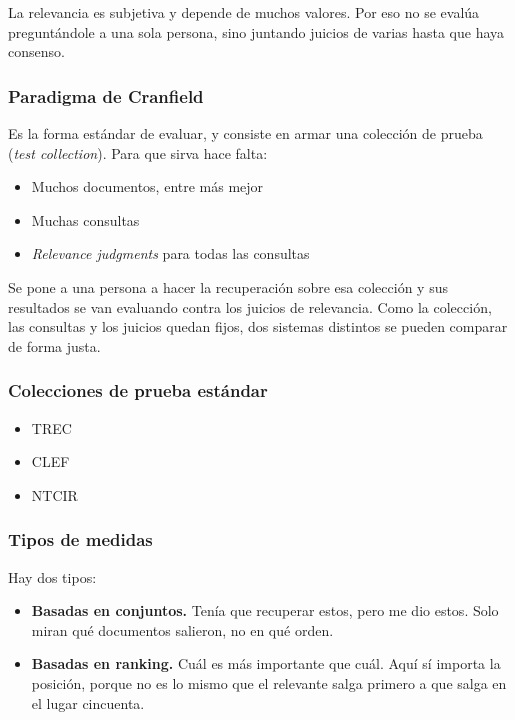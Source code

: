 \documentclass[11pt,letterpaper]{article}
\begin{document}
\begin{ojo}
    La relevancia es subjetiva y depende de muchos valores. Por eso no
    se evalúa preguntándole a una sola persona, sino juntando juicios
    de varias hasta que haya consenso.
\end{ojo}

\subsubsection*{Paradigma de Cranfield}

Es la forma estándar de evaluar, y consiste en armar una colección de
prueba (\textit{test collection}). Para que sirva hace falta:

\begin{itemize}[itemsep=0.1em]
    \item Muchos documentos, entre más mejor
    \item Muchas consultas
    \item \textit{Relevance judgments} para todas las consultas
\end{itemize}

Se pone a una persona a hacer la recuperación sobre esa colección y
sus resultados se van evaluando contra los juicios de relevancia. Como
la colección, las consultas y los juicios quedan fijos, dos sistemas
distintos se pueden comparar de forma justa.

\subsubsection*{Colecciones de prueba estándar}

\begin{itemize}[itemsep=0.1em]
    \item TREC
    \item CLEF
    \item NTCIR
\end{itemize}

\subsubsection*{Tipos de medidas}

Hay dos tipos:

\begin{itemize}[itemsep=0.2em]
    \item \textbf{Basadas en conjuntos.} Tenía que recuperar estos,
          pero me dio estos. Solo miran qué documentos salieron, no en
          qué orden.
    \item \textbf{Basadas en ranking.} Cuál es más importante que
          cuál. Aquí sí importa la posición, porque no es lo mismo que
          el relevante salga primero a que salga en el lugar
          cincuenta.
\end{itemize}
\end{document}
